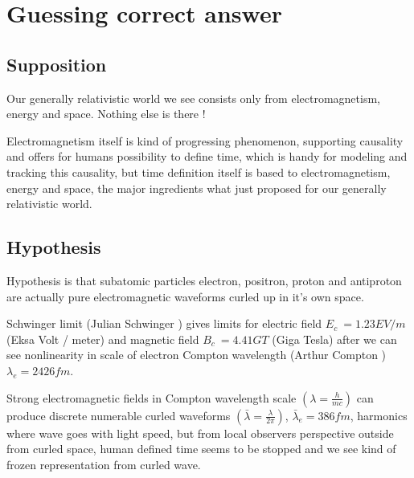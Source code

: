 %
%
%
\begin{comment}\end{comment}
\chapter{Guessing correct answer}
\section{Supposition}
\label{supposition}
Our generally relativistic world we see consists only from electromagnetism,
energy and space. Nothing else is there !

Electromagnetism itself is kind of progressing phenomenon, supporting causality
and offers for humans possibility to define time, which is handy for modeling
and tracking this causality, but time definition itself is based to
electromagnetism, energy and space, the major ingredients what just proposed
for our generally relativistic world.

\section{Hypothesis}
\label{hypothesis}

Hypothesis is that subatomic particles electron, positron, proton and
antiproton are actually pure electromagnetic waveforms curled up in it's own
space.

Schwinger limit (Julian Schwinger \cite{SchwingerLimit}) gives limits for
electric field $E_c~=1.23 EV/m$ (Eksa Volt / meter) and magnetic field
$B_c~=4.41 GT$ (Giga Tesla) after we can see nonlinearity in scale of
electron Compton wavelength (Arthur Compton \cite{ComptonWavelength}) 
$\lambda_e=2426 fm$.


Strong electromagnetic fields in Compton wavelength scale
$(\lambda=\frac{h}{mc})$
can produce discrete numerable curled waveforms
$(\bar{\lambda}=\frac{\lambda}{2\pi})$,
$\bar{\lambda}_e=386 fm$,
harmonics where wave goes with light speed, but from local observers
perspective outside from curled space, human defined time seems to be stopped
and we see kind of frozen representation from curled wave.

